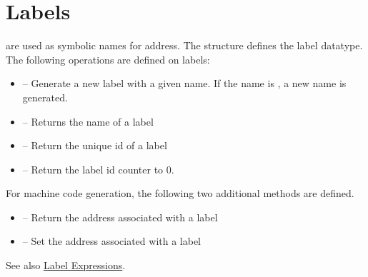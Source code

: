 \section{Labels}

 are used as symbolic names for address.
The structure 
defines the label datatype.  The following operations are defined
on labels:
\begin{itemize}
\item {} --  Generate a new label with
    a given name.  If the name is , a new name is generated.
\item {} -- Returns the name of
   a label
\item {} -- Return the unique id of a label
\item {} -- Return the label id counter to 0.  
\end{itemize}

For machine code generation, the following two additional methods are
defined.
\begin{itemize}
\item  {} -- Return the address associated with
a label
\item  {} --  Set the address associated
with a label
\end{itemize}

See also \href{labelexp.html}{Label Expressions}.
